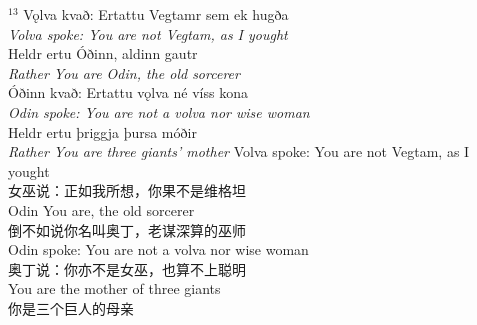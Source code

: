 \begin{paracol}{2}
    \noindent
    $^{13}$ Vǫlva kvað: Ertattu Vegtamr sem ek hugða\\
    \textit{Volva spoke: You are not Vegtam, as I yought}\\
    Heldr ertu Óðinn, aldinn gautr\\
    \textit{Rather You are Odin, the old sorcerer}\\
    Óðinn kvað: Ertattu vǫlva né víss kona\\
    \textit{Odin spoke: You are not a volva nor wise woman}\\
    Heldr ertu þriggja þursa móðir\\
    \textit{Rather You are three giants' mother}\footnotemark[1]
    \switchcolumn
    \noindent
    Volva spoke: You are not Vegtam, as I yought\\
    女巫说：正如我所想，你果不是维格坦\\
    Odin You are, the old sorcerer\\
    倒不如说你名叫奥丁，老谋深算的巫师\\
    Odin spoke: You are not a volva nor wise woman\\
    奥丁说：你亦不是女巫，也算不上聪明\\
    You are the mother of three giants\\
    你是三个巨人的母亲
\end{paracol}

